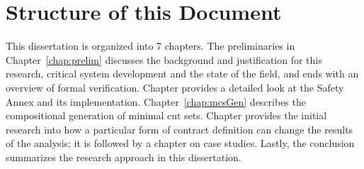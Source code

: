 




\section{Structure of this Document}
This dissertation is organized into 7 chapters. The preliminaries in Chapter~\ref{chap:prelim} discusses the background and justification for this research, critical system development and the state of the field, and ends with an overview of formal verification. Chapter \label{chap:faultModeling} provides a detailed look at the Safety Annex and its implementation. Chapter~\ref{chap:mcsGen} describes the compositional generation of minimal cut sets. Chapter \label{chap:granularity} provides the initial research into how a particular form of contract definition can change the results of the analysis; it is followed by a chapter on case studies. Lastly, the conclusion summarizes the research approach in this dissertation.











